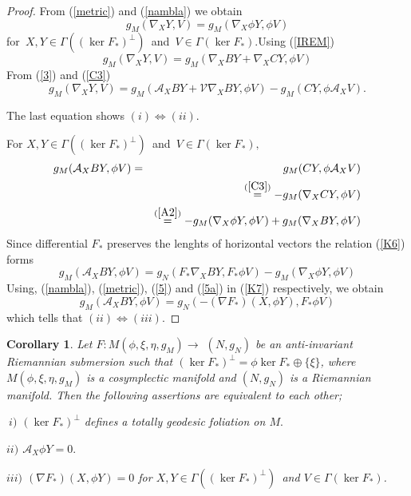 \documentclass{amsart}
\theoremstyle{plain}
\newtheorem{corollary}{Corollary}
\numberwithin{equation}{section}
\begin{document}
\begin{proof}
From (\ref{metric}) and (\ref{nambla}) we obtain\begin{equation*}
g_{M}(\nabla _{X}Y,V)=g_{M}(\nabla _{X}\phi Y,\phi V)
\end{equation*}for\textit{\ }$X,Y\in \Gamma ((\ker F_{\ast })^{\bot })$\textit{\ }and\textit{\ }$V\in \Gamma (\ker F_{\ast }).$Using (\ref{IREM})\begin{equation*}
g_{M}(\nabla _{X}Y,V)=g_{M}(\mathcal{\nabla }_{X}BY+\mathcal{\nabla }_{X}CY,\phi V)
\end{equation*}From (\ref{3}) and (\ref{C3}) 
\begin{equation*}
g_{M}(\nabla _{X}Y,V)=g_{M}(\mathcal{A}_{X}BY+\mathcal{V}\nabla _{X}BY,\phi
V)-g_{M}(CY,\phi \mathcal{A}_{X}V).
\end{equation*}

The last equation shows $(i)\Leftrightarrow (ii)$.

For $X,Y\in \Gamma ((\ker F_{\ast })^{\bot })$\textit{\ }and\textit{\ }$V\in
\Gamma (\ker F_{\ast }),$\begin{eqnarray}
g_{M}(\mathcal{A}_{X}BY,\phi V) &=&g_{M}(CY,\phi \mathcal{A}_{X}V)  \notag \\
&&\overset{(\ref{C3})}{=}-g_{M}(\nabla _{X}CY,\phi V)  \notag \\
&&\overset{(\ref{A2})}{=}-g_{M}(\nabla _{X}\phi Y,\phi V)+g_{M}(\nabla
_{X}BY,\phi V)  \label{K6}
\end{eqnarray}Since differential $F_{\ast }$ preserves the lenghts of horizontal vectors
the relation (\ref{K6}) forms\begin{equation}
g_{M}(\mathcal{A}_{X}BY,\phi V)=g_{N}(F_{\ast }\nabla _{X}BY,F_{\ast }\phi
V)-g_{M}(\nabla _{X}\phi Y,\phi V)  \label{K7}
\end{equation}Using, (\ref{nambla}), (\ref{metric}), (\ref{5}) and (\ref{5a}) in (\ref{K7}) respectively, we obtain\begin{equation*}
g_{M}(\mathcal{A}_{X}BY,\phi V)=g_{N}(-(\nabla F_{\ast })(X,\phi Y),F_{\ast
}\phi V)
\end{equation*}which tells that $(ii)\Leftrightarrow (iii)$.
\end{proof}

\begin{corollary}
Let $F:M(\phi ,\xi ,\eta ,g_{M})\rightarrow $ $(N,g_{N})$ be an
anti-invariant Riemannian submersion such that $(\ker F_{\ast })^{\bot
}=\phi \ker F_{\ast }\oplus \{\xi \}$, where $M(\phi ,\xi ,\eta ,g_{M})$ is
a cosymplectic manifold and $(N,g_{N})$ is a Riemannian manifold. Then the
following assertions are equivalent to each other;

$\ i)$ $(\ker F_{\ast })^{\bot }$ \textit{defines a totally geodesic
foliation on }$M.$

$ii)$ $\mathcal{A}_{X}\phi Y=0.$

$iii)$ $(\nabla F_{\ast })(X,\phi Y)=0$ \textit{for }$X,Y\in \Gamma ((\ker
F_{\ast })^{\bot })$\textit{\ and }$V\in \Gamma (\ker F_{\ast })$.
\end{corollary}
\end{document}
